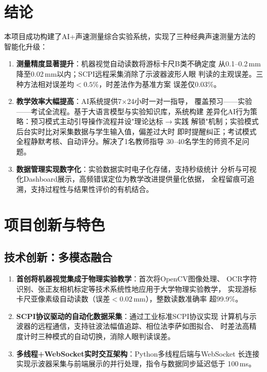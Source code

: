 \section{结论}

本项目成功构建了AI+声速测量综合实验系统，实现了三种经典声速测量方法的
智能化升级：

\begin{enumerate}
    \item \textbf{测量精度显著提升}：机器视觉自动读数将游标卡尺B类不确定度
          从0.1--0.2\,mm降至0.02\,mm以内；SCPI远程采集消除了示波器波形人眼
          判读的主观误差。三种方法相对误差均$<0.5\%$，时差法作为基准方案
          误差仅0.03\%。

    \item \textbf{教学效率大幅提高}：AI系统提供7$\times$24小时一对一指导，
          覆盖预习——实验——考试全流程。基于大语言模型与实验知识库，系统构建
          差异化AI行为策略：预习模式主动引导操作流程并设"理论达标$\to$实践
          解锁"机制；实验模式后台实时比对采集数据与学生输入值，偏差过大时
          即时提醒纠正；考试模式全程静默考核、自动评分。解决了1名教师指导
          30--40名学生的师资不足问题。

    \item \textbf{数据管理实现数字化}：实验数据实时电子化存储，支持秒级统计
          分析与可视化Dashboard展示，高频错误定位为教学改进提供量化依据，
          全程留痕可追溯，支持过程性与结果性评价的有机结合。
\end{enumerate}

\section{项目创新与特色}

\subsection{技术创新：多模态融合}

\begin{enumerate}
    \item \textbf{首创将机器视觉集成于物理实验教学}：首次将OpenCV图像处理、
          OCR字符识别、张正友相机标定等技术系统性地应用于大学物理实验教学，
          实现游标卡尺亚像素级自动读数（误差$<0.02$\,mm），整数读数准确率
          超99.9\%。

    \item \textbf{SCPI协议驱动的自动化数据采集}：通过工业标准SCPI协议实现
          计算机与示波器的远程通信，支持驻波法幅值追踪、相位法李萨如图拟合、
          时差法高精度计时三种模式的自动切换，消除人眼判读误差。

    \item \textbf{多线程+WebSocket实时交互架构}：Python多线程后端与WebSocket
          长连接实现示波器采集与前端展示的并行处理，指令与数据同步延迟低于
          100\,ms。
\end{enumerate}

